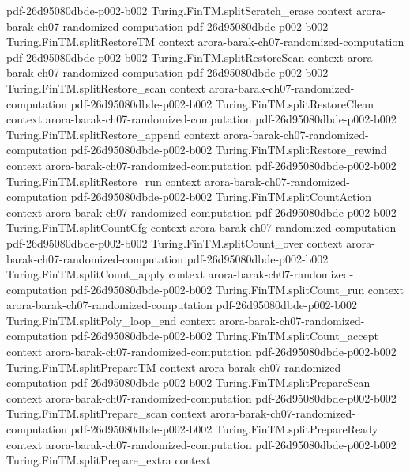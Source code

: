 \begin{theorem}
  {pdf-26d95080dbde-p002-b002}
\proofstep
  {Turing.FinTM.splitScratch_erase}
  {context}
  {arora-barak-ch07-randomized-computation}
  {pdf-26d95080dbde-p002-b002}
\proofstep
  {Turing.FinTM.splitRestoreTM}
  {context}
  {arora-barak-ch07-randomized-computation}
  {pdf-26d95080dbde-p002-b002}
\proofstep
  {Turing.FinTM.splitRestoreScan}
  {context}
  {arora-barak-ch07-randomized-computation}
  {pdf-26d95080dbde-p002-b002}
\proofstep
  {Turing.FinTM.splitRestore_scan}
  {context}
  {arora-barak-ch07-randomized-computation}
  {pdf-26d95080dbde-p002-b002}
\proofstep
  {Turing.FinTM.splitRestoreClean}
  {context}
  {arora-barak-ch07-randomized-computation}
  {pdf-26d95080dbde-p002-b002}
\proofstep
  {Turing.FinTM.splitRestore_append}
  {context}
  {arora-barak-ch07-randomized-computation}
  {pdf-26d95080dbde-p002-b002}
\proofstep
  {Turing.FinTM.splitRestore_rewind}
  {context}
  {arora-barak-ch07-randomized-computation}
  {pdf-26d95080dbde-p002-b002}
\proofstep
  {Turing.FinTM.splitRestore_run}
  {context}
  {arora-barak-ch07-randomized-computation}
  {pdf-26d95080dbde-p002-b002}
\proofstep
  {Turing.FinTM.splitCountAction}
  {context}
  {arora-barak-ch07-randomized-computation}
  {pdf-26d95080dbde-p002-b002}
\proofstep
  {Turing.FinTM.splitCountCfg}
  {context}
  {arora-barak-ch07-randomized-computation}
  {pdf-26d95080dbde-p002-b002}
\proofstep
  {Turing.FinTM.splitCount_over}
  {context}
  {arora-barak-ch07-randomized-computation}
  {pdf-26d95080dbde-p002-b002}
\proofstep
  {Turing.FinTM.splitCount_apply}
  {context}
  {arora-barak-ch07-randomized-computation}
  {pdf-26d95080dbde-p002-b002}
\proofstep
  {Turing.FinTM.splitCount_run}
  {context}
  {arora-barak-ch07-randomized-computation}
  {pdf-26d95080dbde-p002-b002}
\proofstep
  {Turing.FinTM.splitPoly_loop_end}
  {context}
  {arora-barak-ch07-randomized-computation}
  {pdf-26d95080dbde-p002-b002}
\proofstep
  {Turing.FinTM.splitCount_accept}
  {context}
  {arora-barak-ch07-randomized-computation}
  {pdf-26d95080dbde-p002-b002}
\proofstep
  {Turing.FinTM.splitPrepareTM}
  {context}
  {arora-barak-ch07-randomized-computation}
  {pdf-26d95080dbde-p002-b002}
\proofstep
  {Turing.FinTM.splitPrepareScan}
  {context}
  {arora-barak-ch07-randomized-computation}
  {pdf-26d95080dbde-p002-b002}
\proofstep
  {Turing.FinTM.splitPrepare_scan}
  {context}
  {arora-barak-ch07-randomized-computation}
  {pdf-26d95080dbde-p002-b002}
\proofstep
  {Turing.FinTM.splitPrepareReady}
  {context}
  {arora-barak-ch07-randomized-computation}
  {pdf-26d95080dbde-p002-b002}
\proofstep
  {Turing.FinTM.splitPrepare_extra}
  {context}

\end{theorem}
